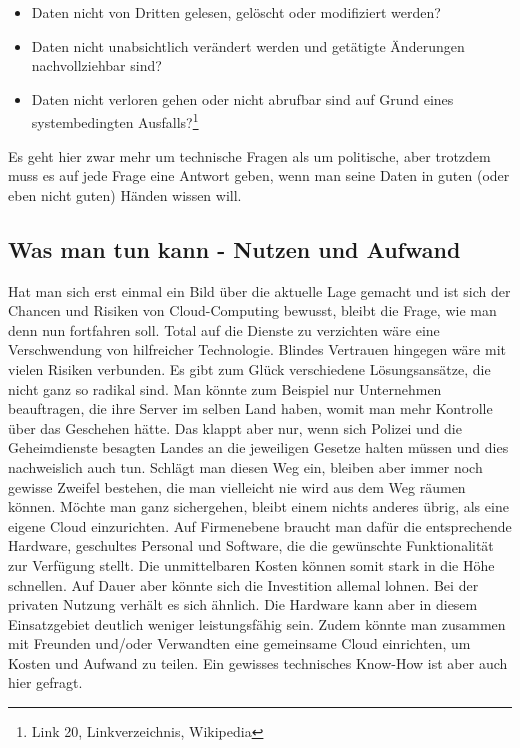 \begin{itemize}
\item Daten nicht von Dritten gelesen, gelöscht oder modifiziert werden?
\item Daten nicht unabsichtlich verändert werden und getätigte Änderungen nachvollziehbar sind?
\item Daten nicht verloren gehen oder nicht abrufbar sind auf Grund eines systembedingten Ausfalls?\footnote{Link 20, Linkverzeichnis, Wikipedia}
\end{itemize}

Es geht hier zwar mehr um technische Fragen als um politische, aber trotzdem muss es auf jede Frage eine Antwort geben, wenn man seine Daten in guten (oder eben nicht guten) Händen wissen will.

\subsection{Was man tun kann - Nutzen und Aufwand}
Hat man sich erst einmal ein Bild über die aktuelle Lage gemacht und ist sich der Chancen und Risiken von Cloud-Computing bewusst, bleibt die Frage, wie man denn nun fortfahren soll. Total auf die Dienste zu verzichten wäre eine Verschwendung von hilfreicher Technologie. Blindes Vertrauen hingegen wäre mit vielen Risiken verbunden. Es gibt zum Glück verschiedene Lösungsansätze, die nicht ganz so radikal sind. Man könnte zum Beispiel nur Unternehmen beauftragen, die ihre Server im selben Land haben, womit man mehr Kontrolle über das Geschehen hätte. Das klappt aber nur, wenn sich Polizei und die Geheimdienste besagten Landes an die jeweiligen Gesetze halten müssen und dies nachweislich auch tun. Schlägt man diesen Weg ein, bleiben aber immer noch gewisse Zweifel bestehen, die man vielleicht nie wird aus dem Weg räumen können. Möchte man ganz sichergehen, bleibt einem nichts anderes übrig, als eine eigene Cloud einzurichten. Auf Firmenebene braucht man dafür die entsprechende Hardware, geschultes Personal und  Software, die die gewünschte Funktionalität zur Verfügung stellt. Die unmittelbaren Kosten können somit stark in die Höhe schnellen. Auf Dauer aber könnte sich die Investition allemal lohnen. Bei der privaten Nutzung verhält es sich ähnlich. Die Hardware kann aber in diesem Einsatzgebiet deutlich weniger leistungsfähig sein. Zudem könnte man zusammen mit Freunden und/oder Verwandten eine gemeinsame Cloud einrichten, um Kosten und Aufwand zu teilen. Ein gewisses technisches Know-How ist aber auch hier gefragt.

